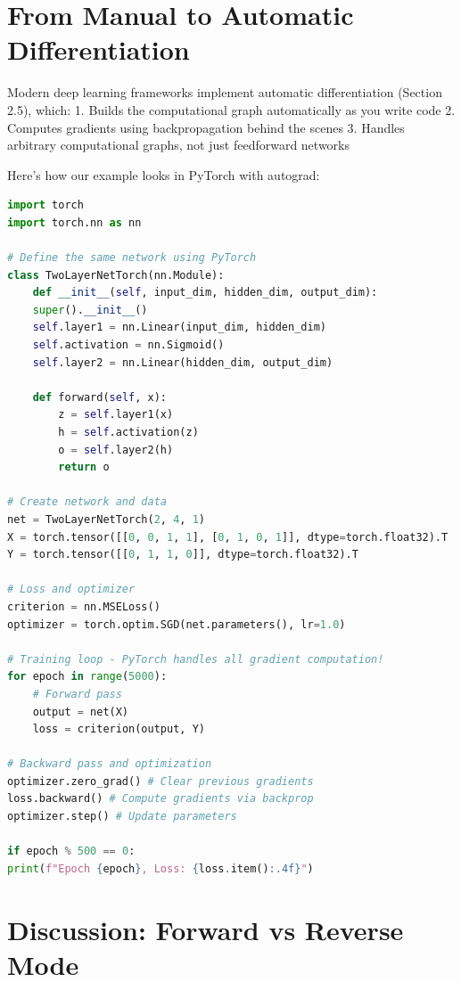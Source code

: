 \documentclass{article}
\begin{document}
\section{From Manual to Automatic Differentiation}

Modern deep learning frameworks implement automatic differentiation (Section 2.5), which:
1. Builds the computational graph automatically as you write code
2. Computes gradients using backpropagation behind the scenes
3. Handles arbitrary computational graphs, not just feedforward networks

Here's how our example looks in PyTorch with autograd:

\begin{lstlisting}[language=Python, caption=Automatic Differentiation Example]
import torch
import torch.nn as nn

# Define the same network using PyTorch
class TwoLayerNetTorch(nn.Module):
    def __init__(self, input_dim, hidden_dim, output_dim):
    super().__init__()
    self.layer1 = nn.Linear(input_dim, hidden_dim)
    self.activation = nn.Sigmoid()
    self.layer2 = nn.Linear(hidden_dim, output_dim)
    
    def forward(self, x):
        z = self.layer1(x)
        h = self.activation(z)
        o = self.layer2(h)
        return o

# Create network and data
net = TwoLayerNetTorch(2, 4, 1)
X = torch.tensor([[0, 0, 1, 1], [0, 1, 0, 1]], dtype=torch.float32).T
Y = torch.tensor([[0, 1, 1, 0]], dtype=torch.float32).T

# Loss and optimizer
criterion = nn.MSELoss()
optimizer = torch.optim.SGD(net.parameters(), lr=1.0)

# Training loop - PyTorch handles all gradient computation!
for epoch in range(5000):
    # Forward pass
    output = net(X)
    loss = criterion(output, Y)
    
# Backward pass and optimization
optimizer.zero_grad() # Clear previous gradients
loss.backward() # Compute gradients via backprop
optimizer.step() # Update parameters

if epoch % 500 == 0:
print(f"Epoch {epoch}, Loss: {loss.item():.4f}")
\end{lstlisting}




\section{Discussion: Forward vs Reverse Mode}
\end{document}
